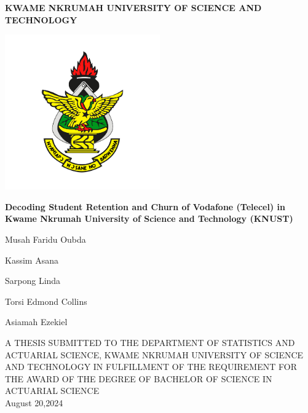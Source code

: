 \documentclass[doublespacing]{report} [12px]%
\begin{document}
\begin{titlepage}
\centering
    \Large\textbf{KWAME NKRUMAH UNIVERSITY OF SCIENCE AND TECHNOLOGY}
    
    
     \begin{center}
\includegraphics[width=0.5\textwidth]{logo.png}\end{center}

    \large{\textbf{Decoding Student Retention and Churn of
Vodafone (Telecel) in Kwame Nkrumah University
of Science and Technology (KNUST)}}
   \\
    \vspace{0.3cm}
    
\large{Musah Faridu Oubda

Kassim Asana

Sarpong Linda

Torsi Edmond Collins

Asiamah Ezekiel}

    \vspace{0.2cm}  
    \small{A THESIS SUBMITTED TO THE DEPARTMENT OF STATISTICS AND ACTUARIAL SCIENCE, KWAME NKRUMAH UNIVERSITY OF SCIENCE AND TECHNOLOGY IN FULFILLMENT OF THE REQUIREMENT FOR THE AWARD OF THE DEGREE OF BACHELOR OF SCIENCE IN ACTUARIAL SCIENCE}\\
    \vspace{0.2cm}
    {August 20,2024}


\end{titlepage}
\end{document}
